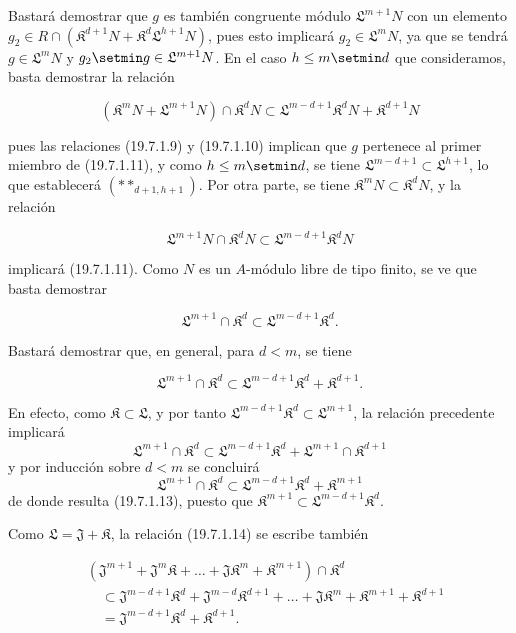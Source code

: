 Bastará demostrar que $g$ es también congruente módulo $\mathfrak L^{m+1}N$ con un elemento $g_2\in R\cap(\mathfrak K^{d+1}N+\mathfrak K^d\mathfrak L^{h+1}N)$, pues esto implicará $g_2\in\mathfrak L^mN$, ya que se tendrá $g\in\mathfrak L^mN$ y $g_2\setmin g\in\mathfrak L^{m+1}N$. En el caso $h\leq m\setmin d$ que consideramos, basta demostrar la relación
\begin{env}[19.7.1.11]
\label{IV.19.7.1.11}
\[
  (\mathfrak K^mN+\mathfrak L^{m+1}N)\cap\mathfrak K^dN\subset\mathfrak L^{m-d+1}\mathfrak K^dN+\mathfrak K^{d+1}N
\]
\end{env}

pues las relaciones (19.7.1.9) y (19.7.1.10) implican que $g$ pertenece al primer miembro de (19.7.1.11), y como $h\leq m\setmin d$, se tiene $\mathfrak L^{m-d+1}\subset\mathfrak L^{h+1}$, lo que establecerá $(**_{d+1,h+1})$. Por otra parte, se tiene $\mathfrak K^mN\subset\mathfrak K^dN$, y la relación
\begin{env}[19.7.1.12]
\label{IV.19.7.1.12}
\[
  \mathfrak L^{m+1}N\cap\mathfrak K^dN\subset\mathfrak L^{m-d+1}\mathfrak K^dN
\]
\end{env}
implicará (19.7.1.11). Como $N$ es un $A$-módulo libre de tipo finito, se ve que basta demostrar
\begin{env}[19.7.1.13]
\label{IV.19.7.1.13}
\[
  \mathfrak L^{m+1}\cap\mathfrak K^d\subset\mathfrak L^{m-d+1}\mathfrak K^d.
\]
\end{env}

Bastará demostrar que, en general, para $d<m$, se tiene
\begin{env}[19.7.1.14]
\label{IV.19.7.1.14}
\[
  \mathfrak L^{m+1}\cap\mathfrak K^d\subset\mathfrak L^{m-d+1}\mathfrak K^d+\mathfrak K^{d+1}.
\]
\end{env}
En efecto, como $\mathfrak K\subset\mathfrak L$, y por tanto $\mathfrak L^{m-d+1}\mathfrak K^d\subset\mathfrak L^{m+1}$, la relación precedente implicará
\[
  \mathfrak L^{m+1}\cap\mathfrak K^d\subset\mathfrak L^{m-d+1}\mathfrak K^d+\mathfrak L^{m+1}\cap\mathfrak K^{d+1}
\]
y por inducción sobre $d<m$ se concluirá
\[
  \mathfrak L^{m+1}\cap\mathfrak K^d\subset\mathfrak L^{m-d+1}\mathfrak K^d+\mathfrak K^{m+1}
\]
de donde resulta (19.7.1.13), puesto que $\mathfrak K^{m+1}\subset\mathfrak L^{m-d+1}\mathfrak K^d$.

Como $\mathfrak L=\mathfrak J+\mathfrak K$, la relación (19.7.1.14) se escribe también
\begin{env}[19.7.1.15]
\label{IV.19.7.1.15}
\[
\begin{aligned}
  &(\mathfrak J^{m+1}+\mathfrak J^m\mathfrak K+\ldots+\mathfrak J\mathfrak K^m+\mathfrak K^{m+1})\cap\mathfrak K^d\\
  &\quad\subset\mathfrak J^{m-d+1}\mathfrak K^d+\mathfrak J^{m-d}\mathfrak K^{d+1}+\ldots+\mathfrak J\mathfrak K^m+\mathfrak K^{m+1}+\mathfrak K^{d+1}\\
  &\quad=\mathfrak J^{m-d+1}\mathfrak K^d+\mathfrak K^{d+1}.
\end{aligned}
\]
\end{env}

